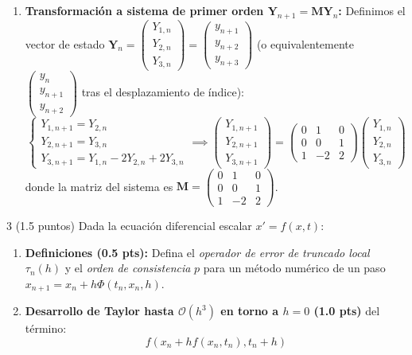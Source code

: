 \begin{sol}
\begin{enumerate}
    \item \textbf{Transformación a sistema de primer orden $\mathbf{Y}_{n+1} = \mathbf{M}\mathbf{Y}_n$:}
    Definimos el vector de estado $\mathbf{Y}_n = \begin{pmatrix} Y_{1,n} \\ Y_{2,n} \\ Y_{3,n} \end{pmatrix} = \begin{pmatrix} y_{n+1} \\ y_{n+2} \\ y_{n+3} \end{pmatrix}$ (o equivalentemente $\begin{pmatrix} y_n \\ y_{n+1} \\ y_{n+2} \end{pmatrix}$ tras el desplazamiento de índice):
    $$
    \begin{cases}
        Y_{1,n+1} = Y_{2,n} \\
        Y_{2,n+1} = Y_{3,n} \\
        Y_{3,n+1} = Y_{1,n} - 2Y_{2,n} + 2Y_{3,n}
    \end{cases}
    \implies
    \begin{pmatrix} Y_{1,n+1} \\ Y_{2,n+1} \\ Y_{3,n+1} \end{pmatrix} =
    \begin{pmatrix}
        0 & 1 & 0 \\
        0 & 0 & 1 \\
        1 & -2 & 2
    \end{pmatrix}
    \begin{pmatrix} Y_{1,n} \\ Y_{2,n} \\ Y_{3,n} \end{pmatrix}
    $$
    donde la matriz del sistema es $\mathbf{M} = \begin{pmatrix} 0 & 1 & 0 \\ 0 & 0 & 1 \\ 1 & -2 & 2 \end{pmatrix}$.
\end{enumerate}
\end{sol}

\vspace{0.5cm}

\begin{ejer}{3 (1.5 puntos)}
Dada la ecuación diferencial escalar $x' = f(x, t)$:
\begin{enumerate}
    \item \textbf{Definiciones (0.5 pts):} Defina el \textit{operador de error de truncado local} $\tau_n(h)$ y el \textit{orden de consistencia} $p$ para un método numérico de un paso $x_{n+1} = x_n + h\Phi(t_n, x_n, h)$.
    \item \textbf{Desarrollo de Taylor hasta $\mathcal{O}(h^3)$ en torno a $h = 0$ (1.0 pts)} del término:
    $$f(x_n + h f(x_n, t_n), t_n + h)$$
\end{enumerate}
\end{ejer}

